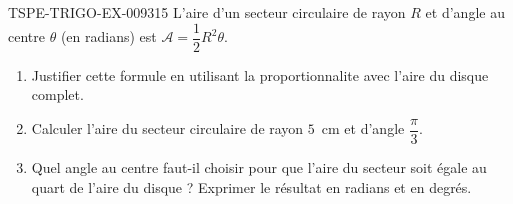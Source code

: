 \begin{exercice}{TSPE-TRIGO-EX-009}{3}{15}
L'aire d'un secteur circulaire de rayon $R$ et d'angle au centre $\theta$ (en radians) est $\mathcal{A} = \dfrac{1}{2}R^2\theta$.
\begin{enumerate}
  \item Justifier cette formule en utilisant la proportionnalite avec l'aire du disque complet.
  \item Calculer l'aire du secteur circulaire de rayon $5$~cm et d'angle $\dfrac{\pi}{3}$.
  \item Quel angle au centre faut-il choisir pour que l'aire du secteur soit égale au quart de l'aire du disque ? Exprimer le résultat en radians et en degrés.
\end{enumerate}
\end{exercice}
